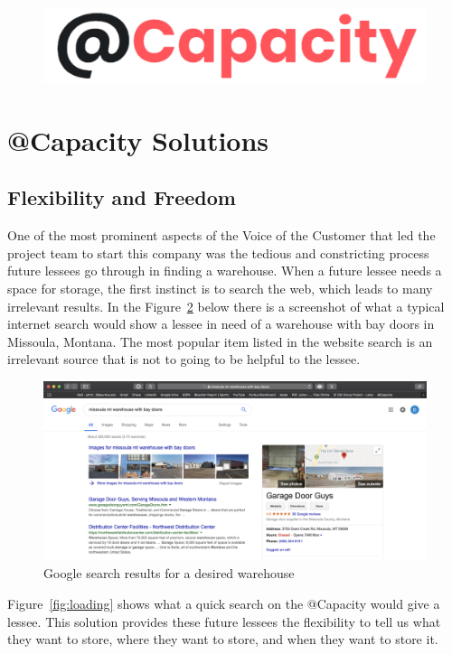 \vspace{80px}
\begin{figure}[H]
\centering
\includegraphics[width=.65\textwidth]{Phase_3/Capacity_Logo_Trans.png}
\label{fig:@Capacity}
\end{figure}

\pagebreak
\section{@Capacity Solutions}
\subsection{Flexibility and Freedom}
One of the most prominent aspects of the Voice of the Customer that led the project team to start this company was the tedious and constricting process future lessees go through in finding a warehouse. When a future lessee needs a space for storage, the first instinct is to search the web, which leads to many irrelevant results. In the Figure~\ref{fig:screenshot} below there is a screenshot of what a typical internet search would show a lessee in need of a warehouse with bay doors in Missoula, Montana. The most popular item listed in the website search is an irrelevant source that is not to going to be helpful to the lessee. 

\begin{figure}[H]
\centering
\includegraphics[width=.75\textwidth]{Phase_3/screenshot.png}
\caption{Google search results for a desired warehouse}
\label{fig:screenshot}
\end{figure}

Figure~\ref{fig:loading} shows what a quick search on the @Capacity would give a lessee. This solution provides these future lessees the flexibility to tell us what they want to store, where they want to store, and when they want to store it.  

